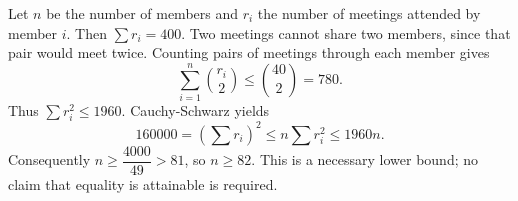 Let $n$ be the number of members and $r_i$ the number of meetings attended by member $i$. Then $\sum r_i=400$. Two meetings cannot share two members, since that pair would meet twice. Counting pairs of meetings through each member gives
\[
\sum_{i=1}^n\binom{r_i}{2}\le\binom{40}{2}=780.
\]
Thus $\sum r_i^2\le1960$. Cauchy-Schwarz yields
\[
160000=(\sum r_i)^2\le n\sum r_i^2\le1960n.
\]
Consequently $n\ge\dfrac{4000}{49}>81$, so $\boxed{n\ge82}$. This is a necessary lower bound; no claim that equality is attainable is required.
